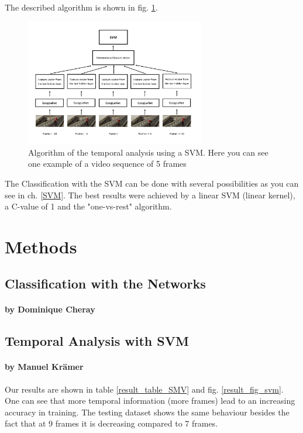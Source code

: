 \documentclass[11pt]{report}
\begin{document}
The described algorithm is shown in fig. \ref{fig_svm}.

\begin{figure}
  \centering
  \includegraphics[width=0.7\textwidth]{Illustration_SVM.png}
  \caption{Algorithm of the temporal analysis using a SVM. Here you can see one example of a video sequence of 5 frames}
  \label{fig_svm}
\end{figure}

The Classification with the SVM can be done with several possibilities as you can see in ch. \ref{SVM}. The best results were achieved by a linear SVM (linear kernel), a C-value of 1 and the "one-vs-rest" algorithm. 


\chapter{Methods}
\section{Classification with the Networks}
\subsubsection{by Dominique Cheray}

\section{Temporal Analysis with SVM}
\subsubsection{by Manuel Krämer}
Our results are shown in table \ref{result_table_SMV} and fig. \ref{result_fig_svm}.
One can see that more temporal information (more frames) lead to an increasing accuracy in training. The testing dataset shows the same behaviour besides the fact that at 9 frames it is decreasing compared to 7 frames. \\
\end{document}

